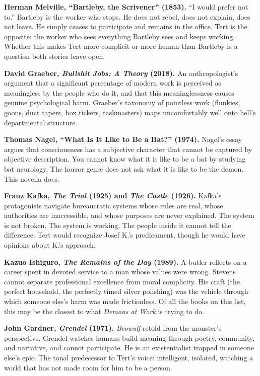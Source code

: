 \bigskip

\textbf{Herman Melville, ``Bartleby, the Scrivener'' (1853).}
``I would prefer not to.'' Bartleby is the worker who stops. He does not rebel, does not explain, does not leave. He simply ceases to participate and remains in the office. Tert is the opposite: the worker who sees everything Bartleby sees and keeps working. Whether this makes Tert more complicit or more human than Bartleby is a question both stories leave open.

\bigskip

\textbf{David Graeber, \emph{Bullshit Jobs: A Theory} (2018).}
An anthropologist's argument that a significant percentage of modern work is perceived as meaningless by the people who do it, and that this meaninglessness causes genuine psychological harm. Graeber's taxonomy of pointless work (flunkies, goons, duct tapers, box tickers, taskmasters) maps uncomfortably well onto hell's departmental structure.

\bigskip

\textbf{Thomas Nagel, ``What Is It Like to Be a Bat?'' (1974).}
Nagel's essay argues that consciousness has a subjective character that cannot be captured by objective description. You cannot know what it is like to be a bat by studying bat neurology. The horror genre does not ask what it is like to be the demon. This novella does.

\bigskip

\textbf{Franz Kafka, \emph{The Trial} (1925) and \emph{The Castle} (1926).}
Kafka's protagonists navigate bureaucratic systems whose rules are real, whose authorities are inaccessible, and whose purposes are never explained. The system is not broken. The system is working. The people inside it cannot tell the difference. Tert would recognize Josef K.'s predicament, though he would have opinions about K.'s approach.

\bigskip

\textbf{Kazuo Ishiguro, \emph{The Remains of the Day} (1989).}
A butler reflects on a career spent in devoted service to a man whose values were wrong. Stevens cannot separate professional excellence from moral complicity. His craft (the perfect household, the perfectly timed silver polishing) was the vehicle through which someone else's harm was made frictionless. Of all the books on this list, this may be the closest to what \emph{Demons at Work} is trying to do.

\bigskip

\textbf{John Gardner, \emph{Grendel} (1971).}
\emph{Beowulf} retold from the monster's perspective. Grendel watches humans build meaning through poetry, community, and narrative, and cannot participate. He is an existentialist trapped in someone else's epic. The tonal predecessor to Tert's voice: intelligent, isolated, watching a world that has not made room for him to be a person.

